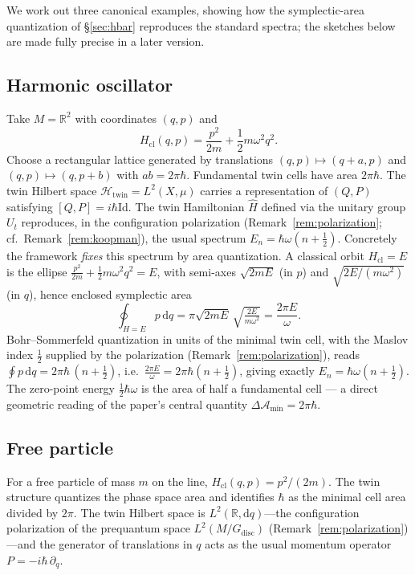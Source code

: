 \documentclass[11pt]{article}
\numberwithin{equation}{section}
\theoremstyle{definition}
\theoremstyle{remark}
\newcommand{\R}{\mathbb{R}}
\newcommand{\dd}{\mathrm{d}}
\newcommand{\Id}{\mathrm{Id}}
\newcommand{\Htw}{\mathcal{H}_{\mathrm{twin}}}
\newcommand{\Gdisc}{G_{\mathrm{disc}}}
\begin{document}
	We work out three canonical examples, showing how the symplectic-area quantization of \S\ref{sec:hbar} reproduces the standard spectra; the sketches below are made fully precise in a later
	version.
	
	\subsection{Harmonic oscillator}
	
	Take $M=\R^2$ with coordinates $(q,p)$ and
	\[
	H_{\mathrm{cl}}(q,p) = \frac{p^2}{2m} + \frac{1}{2}m\omega^2 q^2.
	\]
	Choose a rectangular lattice generated by translations
	$(q,p)\mapsto(q+a,p)$ and $(q,p)\mapsto(q,p+b)$ with $ab=2\pi\hbar$.
	Fundamental twin cells have area $2\pi\hbar$. The twin Hilbert space
	$\Htw=L^2(X,\mu)$ carries a representation of $(Q,P)$ satisfying
	$[Q,P]=i\hbar\Id$. The twin Hamiltonian $\widehat{H}$ defined via the
	unitary group $U_t$ reproduces, in the configuration polarization (Remark~\ref{rem:polarization}; cf.\ Remark~\ref{rem:koopman}), the usual spectrum
	$E_n=\hbar\omega(n+\tfrac12)$. Concretely the framework \emph{fixes} this spectrum by area quantization. A
classical orbit $H_{\mathrm{cl}}=E$ is the ellipse $\tfrac{p^2}{2m}+\tfrac12 m\omega^2 q^2=E$, with semi-axes
$\sqrt{2mE}$ (in $p$) and $\sqrt{2E/(m\omega^2)}$ (in $q$), hence enclosed symplectic area
\[
\oint_{H=E} p\,\dd q=\pi\sqrt{2mE}\,\sqrt{\tfrac{2E}{m\omega^2}}=\frac{2\pi E}{\omega}.
\]
Bohr--Sommerfeld quantization in units of the minimal twin cell, with the Maslov index $\tfrac12$ supplied by
the polarization (Remark~\ref{rem:polarization}), reads $\oint p\,\dd q=2\pi\hbar\,(n+\tfrac12)$, i.e.\
$\tfrac{2\pi E}{\omega}=2\pi\hbar(n+\tfrac12)$, giving exactly $E_n=\hbar\omega(n+\tfrac12)$. The zero-point
energy $\tfrac12\hbar\omega$ is the area of half a fundamental cell --- a direct geometric reading of the
paper's central quantity $\Delta\mathcal{A}_{\min}=2\pi\hbar$.
	
	\subsection{Free particle}
	
	For a free particle of mass $m$ on the line, $H_{\mathrm{cl}}(q,p) =
	p^2/(2m)$. The twin structure quantizes the phase space area and
	identifies $\hbar$ as the minimal cell area divided by $2\pi$. The twin
	Hilbert space is $L^2(\R,\dd q)$---the configuration polarization of the prequantum space $L^2(M/\Gdisc)$ (Remark~\ref{rem:polarization})---and the generator of translations in
	$q$ acts as the usual momentum operator $P=-i\hbar\,\partial_q$.
	
\end{document}
